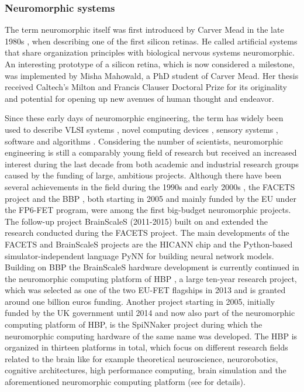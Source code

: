 \subsubsection{Neuromorphic systems}

The term neuromorphic itself was first introduced by Carver Mead in the late 1980s \cite{Mead90}, when describing one of the first silicon retinas.
He called artificial systems that share organization principles with biological nervous systems neuromorphic.
An interesting prototype of a silicon retina, which is now considered a milestone, was implemented by Misha Mahowald, a PhD student of Carver Mead.
Her thesis received Caltech's Milton and Francis Clauser Doctoral Prize for its originality and potential for opening up new avenues of human thought and endeavor.

Since these early days of neuromorphic engineering, the term has widely been used to describe \ac{VLSI} systems \cite{Mead1989}, novel computing devices \cite{Schemmel2010}, sensory systems \cite{Lichtsteiner2008, Liu2010}, software \cite{Davison2008, Bekolay2014} and algorithms \cite{ReverterValeiras2016}.
Considering the number of scientists, neuromorphic engineering is still a comparably young field of research but received an increased interest during the last decade from both academic and industrial research groups caused by the funding of large, ambitious projects.
Although there have been several achievements in the field during the 1990s \cite{Mead1989, Mahowald1992, Indiveri1997, Cauwenberghs1998} and early 2000s \cite{Liu2002}, the \ac{FACETS} project \cite{FACETS-proj} and the \ac{BBP} \cite{BlueBrain-proj}, both starting in 2005 and mainly funded by the \ac{EU} under the FP6-\ac{FET} program, were among the first big-budget neuromorphic projects.
The follow-up project \ac{BrainScaleS} \cite{BrainScaleS-proj, Schemmel2010} (2011-2015) built on and extended the research conducted during the \ac{FACETS} project.
The main developments of the \ac{FACETS} and \ac{BrainScaleS} projects are the \ac{HICANN} chip \cite{Schemmel2010} and the Python-based simulator-independent language \ac{PyNN} \cite{Davison2008} for building neural network models.
Building on \ac{BBP} the \ac{BrainScaleS} hardware development is currently continued in the neuromorphic computing platform of \ac{HBP} \cite{HBP-proj, Calimera2013}, a large ten-year research project, which was selected as one of the two \ac{EU}-\ac{FET} flagships in 2013 and is granted around one billion euros funding.
Another project starting in 2005, initially funded by the UK government until 2014 and now also part of the neuromorphic computing platform of \ac{HBP}, is the \ac{SpiNNaker} project \cite{Furber2014} during which the neuromorphic computing hardware of the same name was developed.
The \ac{HBP} is organized in thirteen platforms in total, which focus on different research fields related to the brain like for example theoretical neuroscience, neurorobotics, cognitive architectures, high performance computing, brain simulation and the aforementioned neuromorphic computing platform (see \cite{HBP-proj} for details).

